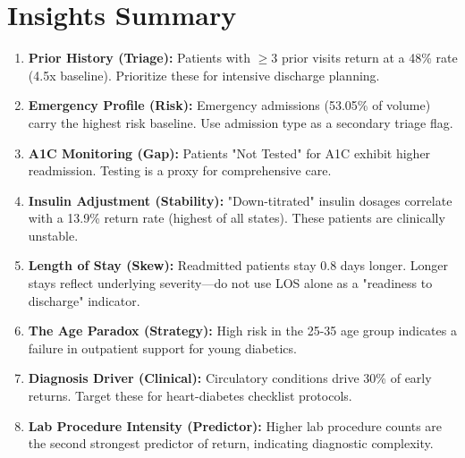 \documentclass[12pt,a4paper]{article}
\begin{document}
\section{Insights Summary}
\begin{enumerate}
    \item \textbf{Prior History (Triage):} Patients with $\ge 3$ prior visits return at a 48\% rate (4.5x baseline). Prioritize these for intensive discharge planning.
    \item \textbf{Emergency Profile (Risk):} Emergency admissions (53.05\% of volume) carry the highest risk baseline. Use admission type as a secondary triage flag.
    \item \textbf{A1C Monitoring (Gap):} Patients "Not Tested" for A1C exhibit higher readmission. Testing is a proxy for comprehensive care.
    \item \textbf{Insulin Adjustment (Stability):} "Down-titrated" insulin dosages correlate with a 13.9\% return rate (highest of all states). These patients are clinically unstable.
    \item \textbf{Length of Stay (Skew):} Readmitted patients stay 0.8 days longer. Longer stays reflect underlying severity—do not use LOS alone as a "readiness to discharge" indicator.
    \item \textbf{The Age Paradox (Strategy):} High risk in the 25-35 age group indicates a failure in outpatient support for young diabetics.
    \item \textbf{Diagnosis Driver (Clinical):} Circulatory conditions drive 30\% of early returns. Target these for heart-diabetes checklist protocols.
    \item \textbf{Lab Procedure Intensity (Predictor):} Higher lab procedure counts are the second strongest predictor of return, indicating diagnostic complexity.
\end{enumerate}

\end{document}
